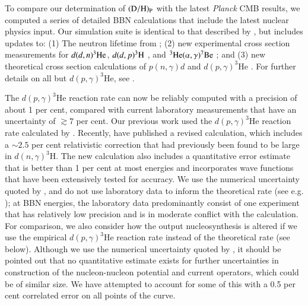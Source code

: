 \documentclass[12pt,preprint,useAMS,usenatbib]{emulateapj}
\begin{document}
To compare our determination of $({\rm D/H})_{\rm P}$ with the latest \textit{Planck}
CMB results, we computed a series of detailed BBN calculations
that include the latest nuclear physics input.
Our simulation suite is identical to that described by
\citet{NolBur00}, but includes updates to:
(1) The neutron lifetime from \citet{PDG14};
(2) new experimental cross section measurements for $d(d,n)^{3}{\rm He}$, $d(d,p)^{3}{\rm H}$ \citep{Gre95,Leo06},
and $^{3}{\rm He}(\alpha,\gamma)^{7}{\rm Be}$ \citep{CybFieOli08,Ade11}; and
(3) new theoretical cross section calculations of $p(n,\gamma)d$ \citep{Rup00}
and $d(p,\gamma)^3\mathrm{He}$ \citep{Mar16}. For further details on all but
$d(p,\gamma)^3\mathrm{He}$, see \citet{NolHol11}.

The $d(p,\gamma)^3\mathrm{He}$
reaction rate can now be reliably computed with a precision of about 1 per cent,
compared with current laboratory measurements that have an uncertainty of $\gtrsim7$ per cent.
Our previous work used the $d(p,\gamma)^3\mathrm{He}$ reaction rate calculated by \citet{Mar05}.
Recently, \citet{Mar16} have published a revised calculation, which includes
a $\sim 2.5$ per cent relativistic correction that had previously been found
to be large in $d(n,\gamma)^3\mathrm{H}$. 
The new calculation also includes a quantitative error estimate that
is better than 1 per cent at most energies and incorporates wave
functions that have been extensively tested for accuracy.
We use the numerical uncertainty quoted by \citet{Mar16},
and do not use laboratory data to inform the theoretical rate
(see e.g. \citealt{Coc15}); at BBN energies, the laboratory data predominantly
consist of one experiment that has relatively low precision and is in moderate
conflict with the calculation. For comparison, we also consider how the
output nucleosynthesis is altered if we use the empirical
$d(p,\gamma)^3\mathrm{He}$ reaction rate instead of
the theoretical rate (see below).
Although we use the numerical uncertainty quoted by \citet{Mar16},
it should be pointed out that no quantitative estimate
exists for further uncertainties in construction of the
nucleon-nucleon potential and current operators, which could be of
similar size.  We have attempted to account for some of this with a
0.5 per cent correlated error on all points of the curve.
\end{document}
